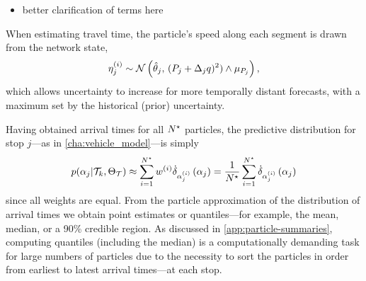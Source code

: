 \begin{itemize}
\item better clarification of terms here
\end{itemize}

When estimating travel time, the particle's speed along each segment is drawn from the network state,
\begin{equation}
\label{sec:particle_travel_time_pred}
\eta^{(i)}_j \sim
\mathcal{N}\left(\hat{\theta}_j,\, 
  (P_j + \Delta_jq)^2)\wedge\mu_{P_j}
\right),
\end{equation}
which allows uncertainty to increase for more temporally distant forecasts, with a maximum set by the historical (prior) uncertainty.


Having obtained arrival times for all $N^\star$ particles, the predictive distribution for stop $j$---as in \cref{cha:vehicle_model}---is simply
\begin{equation}
\label{eq:particle_predictive_dist}
p(\alpha_j | \mathcal{T}_k, \Theta_{\mathcal{T}}) \approx
\sum_{i=1}^{N^\star} w^{(i)} \dot\delta_{\alpha_j^{(i)}}\left(\alpha_j\right)
= \frac{1}{N^\star}\sum_{i=1}^{N^\star} \dot\delta_{\alpha_j^{(i)}}\left(\alpha_j\right)
\end{equation}
since all weights are equal. From the particle approximation of the distribution of arrival times we obtain point estimates or quantiles---for example, the mean, median, or a 90\% credible region. As discussed in \cref{app:particle-summaries}, computing quantiles (including the median) is a computationally demanding task for large numbers of particles due to the necessity to sort the particles in order from earliest to latest arrival times---at each stop.
